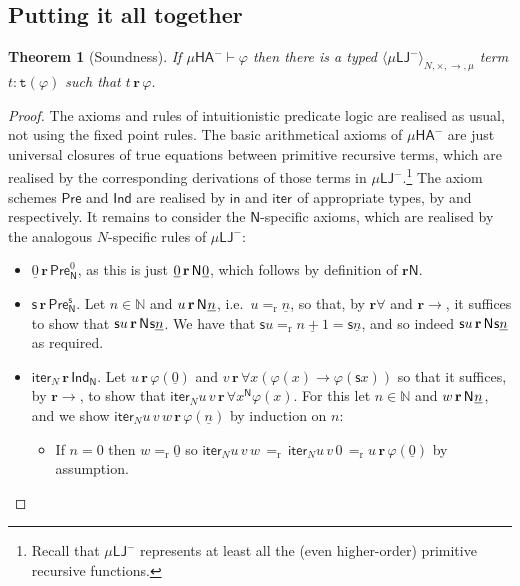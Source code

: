 \documentclass[10pt,a4paper]{amsart}
\theoremstyle{plain}
\newtheorem{theorem}[theorem]{Theorem}
\theoremstyle{definition}
\renewcommand{\phi}{\varphi}
\theoremstyle{plain}
\theoremstyle{definition} %
\renewcommand{\succ}{\mathsf s}
\newcommand{\numeral}[1]{\underline{#1}}
\newcommand{\Nat}{\mathbb{N}}
\newcommand{\closure}[1]{\langle #1 \rangle}
\newcommand{\clomuLJneg}{\closure{\muLJneg}}
\newcommand{\typedclomuLJneg}{\clomuLJneg_{\N,\times,\arrow,\mu}}
\newcommand{\nat}{\mathit{N}}
\newcommand{\N}{\nat} %
\newcommand{\arrow}{\to}
\newcommand{\iter}[1]{\mathsf{iter}_{#1}}
\newcommand{\inj}{\mathsf{in}}
\newcommand{\Niter}{\iter \N}
\newcommand{\LJ}{\mathsf{LJ}}
\newcommand{\muLJ}{\mu\LJ}
\newcommand{\muLJneg}{\muLJ^-}
\newcommand{\reduction}{\mathrm{r}}
\newcommand{\converts}{=_{\reduction}}
\newcommand{\limp}{\to}
\newcommand{\proves}{\vdash}
\newcommand{\HA}{\mathsf{HA}}
\newcommand{\muHA}{\mu\HA}
\newcommand{\preaxiom}{\mathsf{Pre}}
\newcommand{\nprezero}{\preaxiom^0_\pNat}
\newcommand{\npresucc}{\preaxiom^\succ_\pNat}
\newcommand{\indaxiom}{\mathsf{Ind}}
\newcommand{\nindaxiom}{\indaxiom_\pNat}
\newcommand{\realises}{\mathbf{r}}
\newcommand{\type}[1]{\mathtt t (#1)}
\newcommand{\pNat}{\mathsf{N}}
\newcommand{\pnat}[1]{\pNat\hspace{.05em} #1 }
\newcommand{\muHAneg}{\muHA^-}
\begin{document}
\subsection{Putting it all together}

\begin{theorem}
    [Soundness]
    \label{thm:realisability-soundness}
    If $\muHAneg \proves \phi$ then there is a typed $\typedclomuLJneg$ term $t:\type \phi$ such that $t\, \realises\, \phi$.
\end{theorem}
\begin{proof}
The axioms and rules of intuitionistic predicate logic are realised as usual, not using the fixed point rules. 
The basic arithmetical axioms of $\muHAneg$ are just universal closures of true equations between primitive recursive terms, which are realised by the corresponding derivations of those terms in $\muLJneg$.\footnote{Recall that $\muLJneg$ represents at least all the (even higher-order) primitive recursive functions.}
The axiom schemes $\preaxiom$ and $\indaxiom$ are realised by $\inj$ and $\iter{}$ of appropriate types, by  and  respectively.
    It remains to consider the $\pNat$-specific axioms,  which are realised by the analogous $\nat$-specific rules of $\muLJneg$:
    \begin{itemize}
        \item $\numeral 0 \, \realises\, \nprezero$, as this is just $\numeral 0\, \realises\, \pnat {\numeral 0}$, which follows by definition of $\realises\pNat$.
        \item $\succ \, \realises\, \npresucc$. Let $n\in \Nat $ and $u\, \realises\, \pnat {\numeral n}$, i.e.\ $u\converts \numeral n$, so that, by $\realises\forall $ and $\realises\limp$, it suffices to show that $\succ u\, \realises\, \pnat{\succ \numeral n}$.
        We have that $\succ u \converts \numeral{n+1} = \succ \numeral n $, and so indeed $\succ u\, \realises\, \pnat{\succ \numeral n}$ as required.
        \item $\Niter\, \realises \, \nindaxiom$.
        Let $u\, \realises\, \phi(\numeral 0)$ and $v\, \realises\, \forall x (\phi(x)\limp \phi(\succ x ))$ so that it suffices, by $\realises\limp$, to show that $\Niter u\, v\, \realises \, \forall x^\pNat \phi(x)$.
        For this let $n\in \Nat $ and $w\, \realises\, \pnat {\numeral n}$, and we show $\Niter u\, v\, w\, \realises\, \phi(\numeral n)$ by induction on $n$:
        \begin{itemize}
            \item If $n=0$ then $w\converts \numeral 0$ so $\Niter u\, v\, w\, \converts\, \Niter u\, v\, 0\, \converts u\, \realises \, \phi(\numeral 0)$ by assumption.

\end{itemize}
\end{itemize}
\end{proof}
\end{document}
